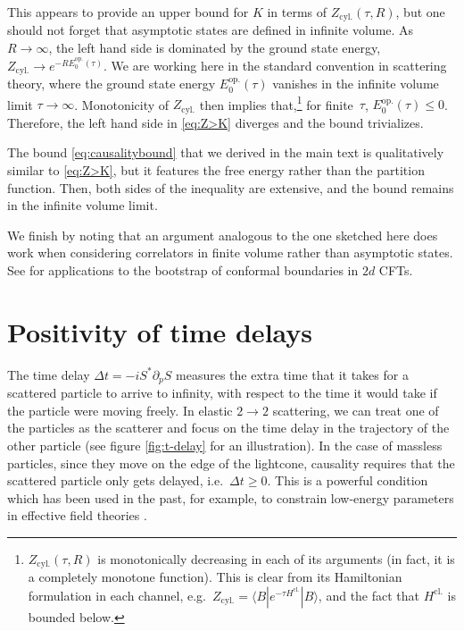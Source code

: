 \documentclass[
 reprint,
 amsmath,
 pre,
 amssymb,
 nofootinbib,
 aps,
 longbibliography,
]{revtex4-1}
\newcommand{\<}{{\langle}}
\renewcommand{\>}{{\rangle}}
\begin{document}
This appears to provide an upper bound for $K$ in terms of $Z_{\text{cyl.}}(\tau ,R)$, but one should not forget that asymptotic states are defined in infinite volume. As $R\to \infty$, the left hand side is dominated by the ground state energy, $Z_{\text{cyl.}}\to e^{-RE_0^\text{op.}(\tau)}$. We are working here in the standard convention in scattering theory, where the ground state energy $E_0^\text{op.}(\tau)$ vanishes in the infinite volume limit $\tau \to\infty$. Monotonicity of $Z_{\text{cyl.}}$ then implies that,\footnote{$Z_{\text{cyl.}}(\tau,R)$ is monotonically decreasing in each of its arguments (in fact, it is a completely monotone function). This is clear from its Hamiltonian formulation in each channel, e.g.\ $Z_{\text{cyl.}} = \langle B|e^{-\tau H^\text{cl.}}|B\rangle$, and the fact that $H^\text{cl.}$ is bounded below.} for finite~$\tau$, $E_0^\text{op.}(\tau)\leq 0$. Therefore, the left hand side in \eqref{eq:Z>K} diverges and the bound trivializes.

The bound \eqref{eq:causalitybound} that we derived in the main text is qualitatively similar to \eqref{eq:Z>K}, but it features the free energy rather than the partition function. Then, both sides of the inequality are extensive, and the bound remains in the infinite volume limit.

We finish by noting that an argument analogous to the one sketched here does work when considering correlators in finite volume rather than asymptotic states. See \cite{Meineri:2025qwz} for applications to the bootstrap of conformal boundaries in $2d$ CFTs.

\vspace{-0.2 in}
\section{Positivity of time delays}\label{app:t-delay}
The time delay $\Delta t= -iS^*\partial_p S$ \cite{eisenbud1948formal,Wigner:1955zz} measures the extra time that it takes for a scattered particle to arrive to infinity, with respect to the time it would take if the particle were moving freely. In elastic $2\to 2$ scattering, we can treat one of the particles as the scatterer and focus on the time delay in the trajectory of the other particle (see figure \ref{fig:t-delay} for an illustration). In the case of massless particles, since they move on the edge of the lightcone, causality requires that the scattered particle only gets delayed, i.e.\ $\Delta t\geq 0$. This is a powerful condition which has been used in the past, for example, to constrain low-energy parameters in effective field theories \cite{Adams:2006sv,Camanho:2014apa}.
\end{document}
